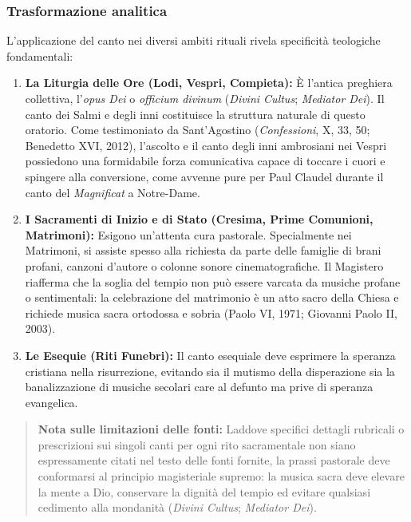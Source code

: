 \documentclass[12pt,a4paper]{article}
\begin{document}
	\subsubsection{Trasformazione analitica}\label{trasformazione-analitica-9}
	
	L'applicazione del canto nei diversi ambiti rituali rivela specificità teologiche fondamentali:
	
	\begin{enumerate}[label=\arabic*.,leftmargin=*]
		\item \textbf{La Liturgia delle Ore (Lodi, Vespri, Compieta):} È l'antica preghiera collettiva, l'\emph{opus Dei} o \emph{officium divinum} (\emph{Divini Cultus}; \emph{Mediator Dei}). Il canto dei Salmi e degli inni costituisce la struttura naturale di questo oratorio. Come testimoniato da Sant'Agostino (\emph{Confessioni}, X, 33, 50; Benedetto XVI, 2012), l'ascolto e il canto degli inni ambrosiani nei Vespri possiedono una formidabile forza comunicativa capace di toccare i cuori e spingere alla conversione, come avvenne pure per Paul Claudel durante il canto del \emph{Magnificat} a Notre-Dame.
		\item \textbf{I Sacramenti di Inizio e di Stato (Cresima, Prime Comunioni, Matrimoni):} Esigono un'attenta cura pastorale. Specialmente nei Matrimoni, si assiste spesso alla richiesta da parte delle famiglie di brani profani, canzoni d'autore o colonne sonore cinematografiche. Il Magistero riafferma che la soglia del tempio non può essere varcata da musiche profane o sentimentali: la celebrazione del matrimonio è un atto sacro della Chiesa e richiede musica sacra ortodossa e sobria (Paolo VI, 1971; Giovanni Paolo II, 2003).
		\item \textbf{Le Esequie (Riti Funebri):} Il canto esequiale deve esprimere la speranza cristiana nella risurrezione, evitando sia il mutismo della disperazione sia la banalizzazione di musiche secolari care al defunto ma prive di speranza evangelica.
	\end{enumerate}
	
	\begin{quote}
		\textbf{Nota sulle limitazioni delle fonti:} Laddove specifici dettagli rubricali o prescrizioni sui singoli canti per ogni rito sacramentale non siano espressamente citati nel testo delle fonti fornite, la prassi pastorale deve conformarsi al principio magisteriale supremo: la musica sacra deve elevare la mente a Dio, conservare la dignità del tempio ed evitare qualsiasi cedimento alla mondanità (\emph{Divini Cultus}; \emph{Mediator Dei}).
	\end{quote}
	
\end{document}

